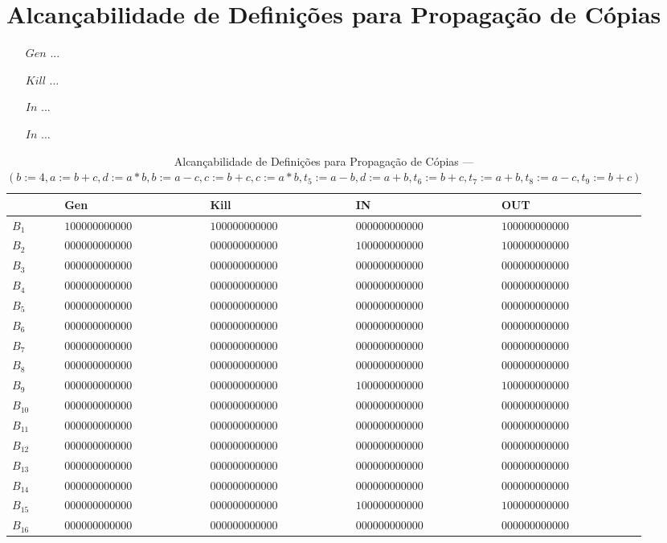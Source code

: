 \section{Alcan\c{c}abilidade de Defini\c{c}\~oes para Propaga\c{c}\~ao de C\'opias}

\begin{itemize}
  \item[$Gen$] ...
  \item[$Kill$] ...
  \item[$In$] ...
  \item[$In$] ...
\end{itemize}

\begin{table}[ht]
\centering
\begin{tabular}{l|l|l|l|l}
	& Gen & Kill & IN & OUT\\
\hline
$B_{1}$ &  $100000000000$ & $100000000000$ & $000000000000$ & $100000000000$\\
$B_{2}$ &  $000000000000$ & $000000000000$ & $100000000000$ & $100000000000$\\
$B_{3}$ &  $000000000000$ & $000000000000$ & $000000000000$ & $000000000000$\\
$B_{4}$ &  $000000000000$ & $000000000000$ & $000000000000$ & $000000000000$\\
$B_{5}$ &  $000000000000$ & $000000000000$ & $000000000000$ & $000000000000$\\
$B_{6}$ &  $000000000000$ & $000000000000$ & $000000000000$ & $000000000000$\\
$B_{7}$ &  $000000000000$ & $000000000000$ & $000000000000$ & $000000000000$\\
$B_{8}$ &  $000000000000$ & $000000000000$ & $000000000000$ & $000000000000$\\
$B_{9}$ &  $000000000000$ & $000000000000$ & $100000000000$ & $100000000000$\\
$B_{10}$ &  $000000000000$ & $000000000000$ & $000000000000$ & $000000000000$\\
$B_{11}$ &  $000000000000$ & $000000000000$ & $000000000000$ & $000000000000$\\
$B_{12}$ &  $000000000000$ & $000000000000$ & $000000000000$ & $000000000000$\\
$B_{13}$ &  $000000000000$ & $000000000000$ & $000000000000$ & $000000000000$\\
$B_{14}$ &  $000000000000$ & $000000000000$ & $000000000000$ & $000000000000$\\
$B_{15}$ &  $000000000000$ & $000000000000$ & $100000000000$ & $100000000000$\\
$B_{16}$ &  $000000000000$ & $000000000000$ & $000000000000$ & $000000000000$\\
\end{tabular}
\caption{Alcan\c{c}abilidade de Defini\c{c}\~oes para Propaga\c{c}\~ao de C\'opias --- $(b:=4, a:=b+c, d:=a*b, b:=a-c, c:=b+c, c:=a*b, t_{5}:=a-b, d:=a+b, t_{6}:=b+c, t_{7}:=a+b, t_{8}:=a-c, t_{9}:=b+c)$}
\end{table}

